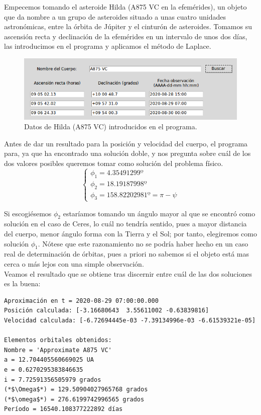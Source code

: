 Empecemos tomando el asteroide Hilda (A875 VC en la efemérides), un objeto que da nombre a un grupo de asteroides situado a unas cuatro unidades astronómicas, entre la órbita de Júpiter y el cinturón de asteroides. Tomamos su ascensión recta y declinación de la efemérides en un intervalo de unos dos días, las introducimos en el programa y aplicamos el método de Laplace.\\

\begin{figure}[H]
\centering
\includegraphics[scale=0.5]{images/hilda_exp.png}
\caption{Datos de Hilda (A875 VC) introducidos en el programa.}
\label{fig:hilda_exp}
\end{figure}

Antes de dar un resultado para la posición y velocidad del cuerpo, el programa para, ya que ha encontrado una solución doble, y nos pregunta sobre cuál de los dos valores posibles queremos tomar como solución del problema físico.\\
\[
\left\{
\begin{array}{l}
\phi_1=4.35491299º\\
\phi_2=18.19187998º\\
\phi_3=158.82202981º=\pi-\psi
\end{array}
\right.
\]

Si escogiésemos $\phi_2$ estaríamos tomando un ángulo mayor al que se encontró como solución en el caso de Ceres, lo cuál no tendría sentido, pues a mayor distancia del cuerpo, menor ángulo forma con la Tierra y el Sol; por tanto, elegiremos como solución $\phi_1$. Nótese que este razonamiento no se podría haber hecho en un caso real de determinación de órbitas, pues a priori no sabemos si el objeto está mas cerca o más lejos con una simple observación.\\

Veamos el resultado que se obtiene tras discernir entre cuál de las dos soluciones es la buena:
\begin{lstlisting}[style=Console]
Aproximación en t = 2020-08-29 07:00:00.000
Posición calculada: [-3.16680643  3.55611002 -0.63839816]
Velocidad calculada: [-6.72694445e-03 -7.39134996e-03 -6.61539321e-05]

Elementos orbitales obtenidos:
Nombre = 'Approximate A875 VC'
a = 12.704405560669025 UA
e = 0.6270295383846635
i = 7.72591356505979 grados
(*$\Omega$*) = 129.50904027965768 grados
(*$\omega$*) = 276.6199742996565 grados
Período = 16540.108377222892 días
\end{lstlisting}


